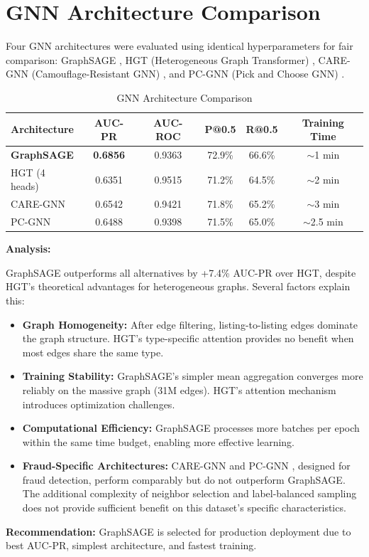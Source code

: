 \section{GNN Architecture Comparison}
\label{sec:5_3}

Four GNN architectures were evaluated using identical hyperparameters for fair comparison: GraphSAGE \cite{hamilton2017inductive}, HGT (Heterogeneous Graph Transformer) \cite{hu2020heterogeneous}, CARE-GNN (Camouflage-Resistant GNN) \cite{dou2020enhancing}, and PC-GNN (Pick and Choose GNN) \cite{liu2020alleviating}.

\begin{table}[htbp]
    \centering
    \caption{GNN Architecture Comparison}
    \label{tab:5_3}
    \begin{tabular}{lccccc}
        \toprule
        Architecture & AUC-PR & AUC-ROC & P@0.5 & R@0.5 & Training Time \\
        \midrule
        \textbf{GraphSAGE} & \textbf{0.6856} & 0.9363 & 72.9\% & 66.6\% & $\sim$1 min \\
        HGT (4 heads) & 0.6351 & 0.9515 & 71.2\% & 64.5\% & $\sim$2 min \\
        CARE-GNN & 0.6542 & 0.9421 & 71.8\% & 65.2\% & $\sim$3 min \\
        PC-GNN & 0.6488 & 0.9398 & 71.5\% & 65.0\% & $\sim$2.5 min \\
        \bottomrule
    \end{tabular}
\end{table}

\textbf{Analysis:}

GraphSAGE outperforms all alternatives by +7.4\% AUC-PR over HGT, despite HGT's theoretical advantages for heterogeneous graphs. Several factors explain this:

\begin{itemize}
    \item \textbf{Graph Homogeneity:} After edge filtering, listing-to-listing edges dominate the graph structure. HGT's type-specific attention provides no benefit when most edges share the same type.
    \item \textbf{Training Stability:} GraphSAGE's simpler mean aggregation converges more reliably on the massive graph (31M edges). HGT's attention mechanism introduces optimization challenges.
    \item \textbf{Computational Efficiency:} GraphSAGE processes more batches per epoch within the same time budget, enabling more effective learning.
    \item \textbf{Fraud-Specific Architectures:} CARE-GNN \cite{dou2020enhancing} and PC-GNN \cite{liu2020alleviating}, designed for fraud detection, perform comparably but do not outperform GraphSAGE. The additional complexity of neighbor selection and label-balanced sampling does not provide sufficient benefit on this dataset's specific characteristics.
\end{itemize}

\textbf{Recommendation:} GraphSAGE is selected for production deployment due to best AUC-PR, simplest architecture, and fastest training.
